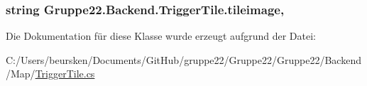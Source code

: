 \hypertarget{class_gruppe22_1_1_backend_1_1_trigger_tile_ad2769e93a4ee569cbf4aec7a282a684f}{
\subsubsection[{tileimage}]{\setlength{\rightskip}{0pt plus 5cm}string Gruppe22.\-Backend.\-Trigger\-Tile.\-tileimage\hspace{0.3cm}{\ttfamily [get]}, {\ttfamily [set]}}}\label{class_gruppe22_1_1_backend_1_1_trigger_tile_ad2769e93a4ee569cbf4aec7a282a684f}


Die Dokumentation für diese Klasse wurde erzeugt aufgrund der Datei\-:\begin{DoxyCompactItemize}
\item 
C\-:/\-Users/beursken/\-Documents/\-Git\-Hub/gruppe22/\-Gruppe22/\-Gruppe22/\-Backend/\-Map/\hyperlink{_trigger_tile_8cs}{Trigger\-Tile.\-cs}\end{DoxyCompactItemize}
